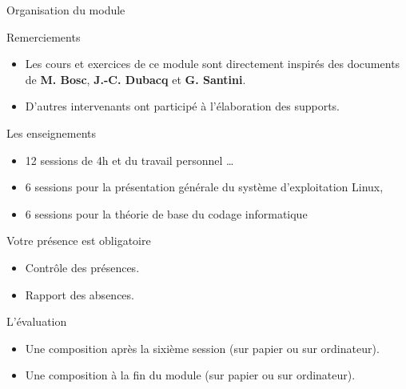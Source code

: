 \begin{frame}{Organisation du module}
  \begin{alertblock}{Remerciements}
    \begin{itemize}
    \item Les cours et exercices de ce module sont directement inspirés
      des documents de \textbf{M. Bosc}, \textbf{J.-C. Dubacq} et \textbf{G. Santini}.
    \item D'autres intervenants ont participé à l'élaboration des supports.
    \end{itemize}
  \end{alertblock}
  \begin{block}{Les enseignements}
    \begin{itemize}
    \item 12 sessions de 4h et du travail personnel \dots
    \item 6 sessions pour la présentation générale du système
      d'exploitation Linux,
    \item 6 sessions pour la théorie de base du codage informatique 
    \end{itemize}
  \end{block}
  \begin{alertblock}{Votre présence est obligatoire}
    \begin{itemize}
    \item Contrôle des présences.
    \item Rapport des absences.
    \end{itemize}
  \end{alertblock}
  \begin{block}{L'évaluation}
    \begin{itemize}
    \item Une composition après la sixième session (sur papier ou sur
      ordinateur).
    \item Une composition à la fin du module (sur papier ou sur
      ordinateur).
    \end{itemize}
  \end{block}
\end{frame}

